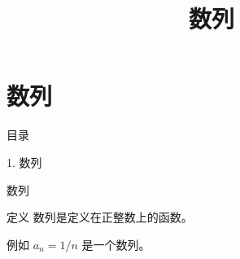 \documentclass[aspectratio=169,10pt,fontset=fandol]{ctexbeamer}
\title{数列}
\begin{document}
\section{数列}
\begin{frame}[t,fragile]{目录}
\normalsize
{\color{blue}\normalsize 1. 数列\par}\vspace{0.22em}
\end{frame}
\begin{frame}[t,fragile]{数列}
\normalsize
\begin{block}{定义}
{\normalsize
数列是定义在正整数上的函数。
}
\end{block}
{\normalsize
例如 $a_n=1/n$ 是一个数列。
}
\end{frame}
\end{document}
